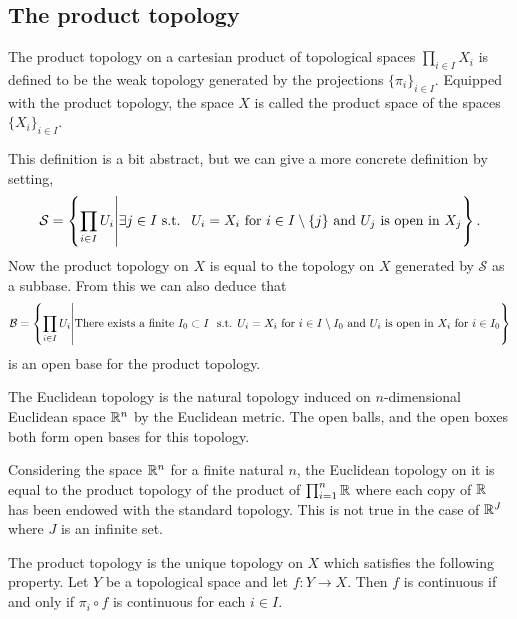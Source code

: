 \documentclass[11pt,a4paper]{article}
\begin{document}
\subsection{The product topology}

\begin{definition}
  The product topology on a cartesian product of topological spaces
  $\prod_{i \in I} X_i$ is defined to be the weak topology generated by
  the projections $\{\pi_i\}_{i \in I}$. Equipped with the product
  topology, the space $X$ is called the product space of the spaces
  $\{X_i\}_{i \in I}$.
\end{definition}

\begin{remark}
  This definition is a bit abstract, but we can give a more concrete 
  definition by setting,
  \[
    \mathcal{S} = \left\{\prod_{i \in I}{U_i} \middle\vert \exists j \in I \text{ s.t. } 
    \text{ $U_i = X_i$ for $i \in I \setminus \{j\}$ and $U_j$ is open in
    $X_j$}\right\}.
  \]
  Now the product topology on $X$ is equal to the topology on $X$ generated
  by $\mathcal{S}$ as a subbase. From this we can also deduce that
  {\small
  \[
    \mathcal{B} = \left\{\prod_{i \in I}U_i \middle\vert
    \text{There exists a finite
    $I_0 \subset I$ \text{ s.t. }$U_i = X_i$ for $i \in I \setminus I_0$ and
    $U_i$ is open in $X_i$ for $i \in I_0$}\right\}
  \]
  }
  is an open base for the product topology.
\end{remark}

\begin{definition}
  The Euclidean topology is the natural topology induced on $n$-dimensional 
  Euclidean space $\mathbb{R}^n$ by the Euclidean metric. The open balls, and
  the open boxes both form open bases for this topology.
\end{definition}

\begin{example}
  Considering the space $\mathbb{R}^n$ for a finite natural $n$, the Euclidean
  topology on it is equal to the product topology of the product of
  $\prod_{i=1}^{n} \mathbb{R}$ where each copy of $\mathbb{R}$ has been endowed with
  the standard topology. This is not true in the case of $\mathbb{R}^J$ where
  $J$ is an infinite set.
\end{example}

\begin{proposition}
  The product topology is the unique topology on $X$ which satisfies the 
  following property. Let $Y$ be a topological space and let 
  $f \colon Y \to X$. Then $f$ is continuous if and only if 
  $\pi_i \circ f$ is continuous for each $i \in I$.
\end{proposition}
\end{document}
